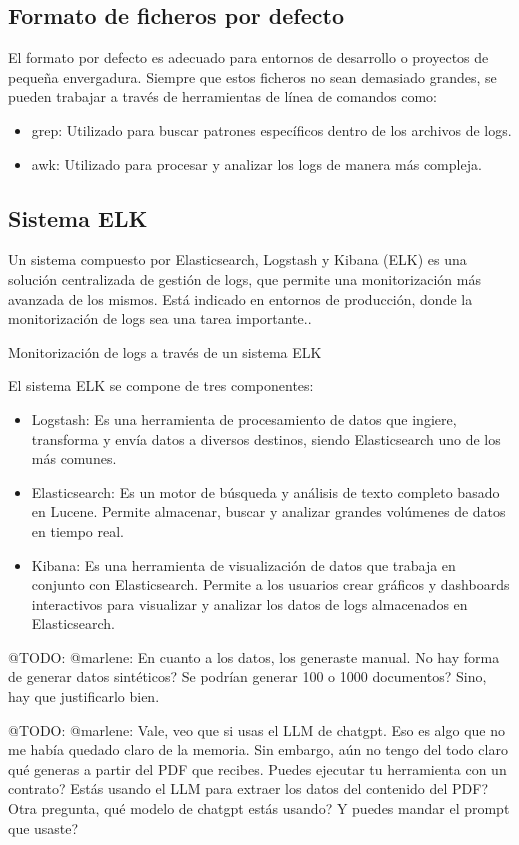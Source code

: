\subsection*{Formato de ficheros por defecto}
El formato por defecto es adecuado para entornos de desarrollo o proyectos de pequeña envergadura. Siempre que estos
ficheros no sean demasiado grandes, se pueden trabajar a través de herramientas de línea de comandos como:

\begin{itemize}
    \item grep: Utilizado para buscar patrones específicos dentro de los archivos de logs.
    \item awk: Utilizado para procesar y analizar los logs de manera más compleja.
\end{itemize}

\subsection*{Sistema ELK}
Un sistema compuesto por Elasticsearch, Logstash y Kibana (ELK) es una solución centralizada de gestión de logs, que
permite una monitorización más avanzada de los mismos. Está indicado en entornos de producción, donde la monitorización
de logs sea una tarea importante..


Monitorización de logs a través de un sistema ELK

El sistema ELK se compone de tres componentes:

\begin{itemize}
    \item
    Logstash: Es una herramienta de procesamiento de datos que ingiere, transforma y envía datos a diversos destinos,
    siendo Elasticsearch uno de los más comunes.
    \item
    Elasticsearch: Es un motor de búsqueda y análisis de texto completo basado en Lucene. Permite almacenar, buscar y
    analizar grandes volúmenes de datos en tiempo real.
    \item Kibana: Es una herramienta de visualización de datos que trabaja en conjunto con Elasticsearch. Permite a los
    usuarios crear gráficos y dashboards interactivos para visualizar y analizar los datos de logs almacenados en
    Elasticsearch.
\end{itemize}

\colorbox{color_highlight}{@TODO: @marlene:}
En cuanto a los datos, los generaste manual. No hay forma de generar datos sintéticos? Se podrían generar 100 o 1000
documentos? Sino, hay que justificarlo bien.

\colorbox{color_highlight}{@TODO: @marlene:}
Vale, veo que si usas el LLM de chatgpt. Eso es algo que no me había quedado claro de la memoria. Sin embargo, aún
no
tengo del todo claro qué generas a partir del PDF que recibes. Puedes ejecutar tu herramienta con un contrato? Estás
usando el LLM para extraer los datos del contenido del PDF? Otra pregunta, qué modelo de chatgpt estás usando? Y
puedes
mandar el prompt que usaste?
